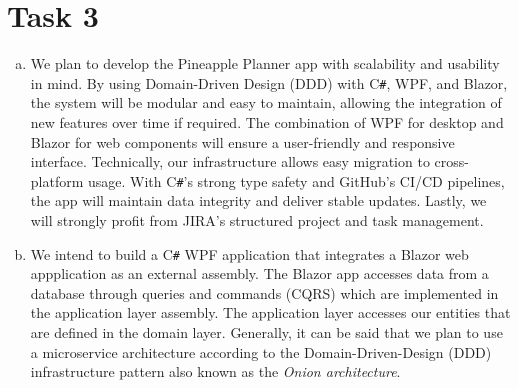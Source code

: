 \documentclass{article}
\begin{document}
\section{Task 3}
\begin{enumerate}[a)]
  \item We plan to develop the Pineapple Planner app with scalability and usability in mind.
        By using Domain-Driven Design (DDD) with C\verb|#|, WPF, and Blazor, the system will be modular and easy to maintain, allowing the integration of new features over time if required.
        The combination of WPF for desktop and Blazor for web components will ensure a user-friendly and responsive interface.
        Technically, our infrastructure allows easy migration to cross-platform usage.
        With C\verb|#|’s strong type safety and GitHub’s CI/CD pipelines, the app will maintain data integrity and deliver stable updates.
        Lastly, we will strongly profit from JIRA's structured project and task management.
  \item We intend to build a C\verb|#| WPF application that integrates a Blazor web appplication as an external assembly.
        The Blazor app accesses data from a database through queries and commands (CQRS) which are implemented in the application layer assembly.
        The application layer accesses our entities that are defined in the domain layer.
        Generally, it can be said that we plan to use a microservice architecture according to the Domain-Driven-Design (DDD) infrastructure pattern also known as the \textit{Onion architecture}.
\end{enumerate}
\end{document}
